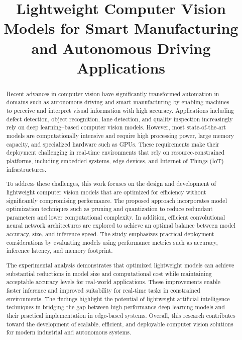 \documentclass[conference]{IEEEtran}
\begin{document}
\title{Lightweight Computer Vision Models for Smart Manufacturing and Autonomous Driving Applications}

\author{
}

\maketitle

\begin{abstract}
Recent advances in computer vision have significantly transformed automation in domains such as autonomous driving and smart manufacturing by enabling machines to perceive and interpret visual information with high accuracy. Applications including defect detection, object recognition, lane detection, and quality inspection increasingly rely on deep learning–based computer vision models. However, most state-of-the-art models are computationally intensive and require high processing power, large memory capacity, and specialized hardware such as GPUs. These requirements make their deployment challenging in real-time environments that rely on resource-constrained platforms, including embedded systems, edge devices, and Internet of Things (IoT) infrastructures.

To address these challenges, this work focuses on the design and development of lightweight computer vision models that are optimized for efficiency without significantly compromising performance. The proposed approach incorporates model optimization techniques such as pruning and quantization to reduce redundant parameters and lower computational complexity. In addition, efficient convolutional neural network architectures are explored to achieve an optimal balance between model accuracy, size, and inference speed. The study emphasizes practical deployment considerations by evaluating models using performance metrics such as accuracy, inference latency, and memory footprint.

The experimental analysis demonstrates that optimized lightweight models can achieve substantial reductions in model size and computational cost while maintaining acceptable accuracy levels for real-world applications. These improvements enable faster inference and improved suitability for real-time tasks in constrained environments. The findings highlight the potential of lightweight artificial intelligence techniques in bridging the gap between high-performance deep learning models and their practical implementation in edge-based systems. Overall, this research contributes toward the development of scalable, efficient, and deployable computer vision solutions for modern industrial and autonomous systems.
\end{abstract}
\end{document}
